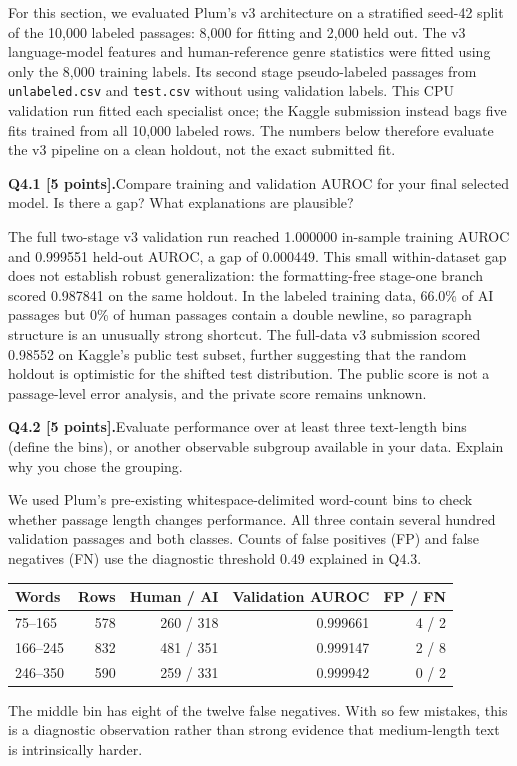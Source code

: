 \documentclass[11pt,letterpaper]{article}
\newcommand{\question}[2]{\needspace{4\baselineskip}\par\addvspace{0.45em}\noindent\textbf{#1}\quad #2\par\nobreak\vspace{0.1em}}
\begin{document}
For this section, we evaluated Plum's v3 architecture on a stratified seed-42 split of the 10,000 labeled passages: 8,000 for fitting and 2,000 held out. The v3 language-model features and human-reference genre statistics were fitted using only the 8,000 training labels. Its second stage pseudo-labeled passages from \texttt{unlabeled.csv} and \texttt{test.csv} without using validation labels. This CPU validation run fitted each specialist once; the Kaggle submission instead bags five fits trained from all 10,000 labeled rows. The numbers below therefore evaluate the v3 pipeline on a clean holdout, not the exact submitted fit.

\question{Q4.1 [5 points].}{Compare training and validation AUROC for your final selected model. Is there a gap? What explanations are plausible?}
The full two-stage v3 validation run reached 1.000000 in-sample training AUROC and 0.999551 held-out AUROC, a gap of 0.000449. This small within-dataset gap does not establish robust generalization: the formatting-free stage-one branch scored 0.987841 on the same holdout. In the labeled training data, 66.0\% of AI passages but 0\% of human passages contain a double newline, so paragraph structure is an unusually strong shortcut. The full-data v3 submission scored 0.98552 on Kaggle's public test subset, further suggesting that the random holdout is optimistic for the shifted test distribution. The public score is not a passage-level error analysis, and the private score remains unknown.
\question{Q4.2 [5 points].}{Evaluate performance over at least three text-length bins (define the bins), or another observable subgroup available in your data. Explain why you chose the grouping.}
We used Plum's pre-existing whitespace-delimited word-count bins to check whether passage length changes performance. All three contain several hundred validation passages and both classes. Counts of false positives (FP) and false negatives (FN) use the diagnostic threshold 0.49 explained in Q4.3.
\begin{tabular}{lrrrr}\toprule Words & Rows & Human / AI & Validation AUROC & FP / FN \\ \midrule
75--165 & 578 & 260 / 318 & 0.999661 & 4 / 2 \\
166--245 & 832 & 481 / 351 & 0.999147 & 2 / 8 \\
246--350 & 590 & 259 / 331 & 0.999942 & 0 / 2 \\ \bottomrule
\end{tabular}
The middle bin has eight of the twelve false negatives. With so few mistakes, this is a diagnostic observation rather than strong evidence that medium-length text is intrinsically harder.
\end{document}
